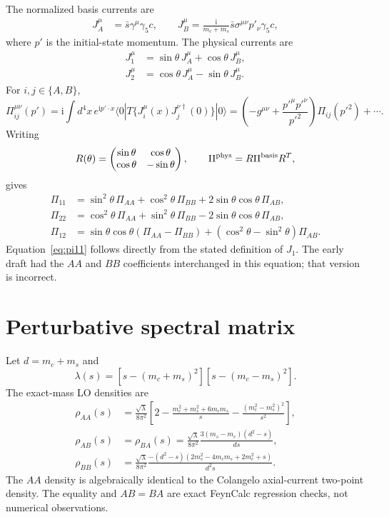 \documentclass[11pt]{article}
\newcommand{\ii}{\mathrm{i}}
\begin{document}
The normalized basis currents are
\begin{align}
J_A^\mu&=\bar s\gamma^\mu\gamma_5c,\qquad
J_B^\mu=\frac{\ii}{m_c+m_s}\bar s\sigma^{\mu\nu}p'_\nu\gamma_5c,
\end{align}
where $p'$ is the initial-state momentum.  The physical currents are
\begin{align}
J_1^\mu&=\sin\theta\,J_A^\mu+\cos\theta\,J_B^\mu,\\
J_2^\mu&=\cos\theta\,J_A^\mu-\sin\theta\,J_B^\mu.
\end{align}
For $i,j\in\{A,B\}$,
\begin{equation}
\Pi_{ij}^{\mu\nu}(p')=\ii\int d^4x\,e^{\ii p'\cdot x}
\langle0|T\{J_i^\mu(x)J_j^{\nu\dagger}(0)\}|0\rangle
=\left(-g^{\mu\nu}+\frac{p'^\mu p'^\nu}{p'^2}\right)\Pi_{ij}(p'^2)+\cdots.
\end{equation}
Writing
\begin{equation}
R(\theta)=\begin{pmatrix}\sin\theta&\cos\theta\\
\cos\theta&-\sin\theta\end{pmatrix},\qquad
\Pi^{\rm phys}=R\Pi^{\rm basis}R^T,
\end{equation}
gives
\begin{align}
\Pi_{11}&=\sin^2\theta\,\Pi_{AA}+\cos^2\theta\,\Pi_{BB}
+2\sin\theta\cos\theta\,\Pi_{AB},\label{eq:pi11}\\
\Pi_{22}&=\cos^2\theta\,\Pi_{AA}+\sin^2\theta\,\Pi_{BB}
-2\sin\theta\cos\theta\,\Pi_{AB},\\
\Pi_{12}&=\sin\theta\cos\theta(\Pi_{AA}-\Pi_{BB})
+(\cos^2\theta-\sin^2\theta)\Pi_{AB}.
\end{align}
Equation~\eqref{eq:pi11} follows directly from the stated definition of
$J_1$.  The early draft had the $AA$ and $BB$ coefficients interchanged in
this equation; that version is incorrect.

\section{Perturbative spectral matrix}

Let $d=m_c+m_s$ and
\begin{equation}
\lambda(s)=[s-(m_c+m_s)^2][s-(m_c-m_s)^2].
\end{equation}
The exact-mass LO densities are
\begin{align}
\rho_{AA}(s)&=\frac{\sqrt\lambda}{8\pi^2}\left[
2-\frac{m_c^2+m_s^2+6m_cm_s}{s}
-\frac{(m_c^2-m_s^2)^2}{s^2}\right],\\
\rho_{AB}(s)&=\rho_{BA}(s)=\frac{\sqrt\lambda}{8\pi^2}
\frac{3(m_s-m_c)(d^2-s)}{ds},\\
\rho_{BB}(s)&=\frac{\sqrt\lambda}{8\pi^2}
\frac{-(d^2-s)(2m_s^2-4m_cm_s+2m_c^2+s)}{d^2s}.
\end{align}
The $AA$ density is algebraically identical to the Colangelo axial-current
two-point density.  The equality and $AB=BA$ are exact FeynCalc regression
checks, not numerical observations.
\end{document}
